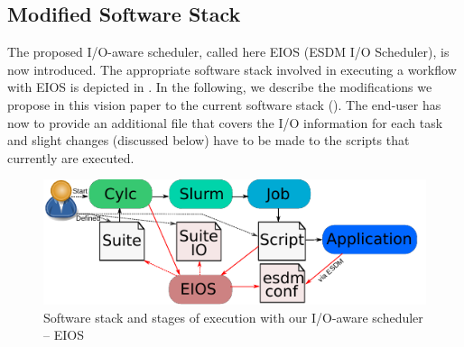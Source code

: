 \documentclass[a4paper]{article}
\begin{document}
\subsection{Modified Software Stack}

The proposed I/O-aware scheduler, called here EIOS (ESDM I/O Scheduler), is now introduced.
The appropriate software stack involved in executing a workflow with EIOS is depicted in .
In the following, we describe the modifications we propose in this vision paper to the current software stack ().
The end-user has now to provide an additional file that covers the I/O information for each task and slight changes (discussed below) have to be made to the scripts that currently are executed.

\begin{figure}[H]
  \centering
  \includegraphics[scale=1.4]{stages-io}
  \caption{Software stack and stages of execution with our I/O-aware scheduler -- EIOS}
  \label{fig:stages-io}
\end{figure}
\end{document}
